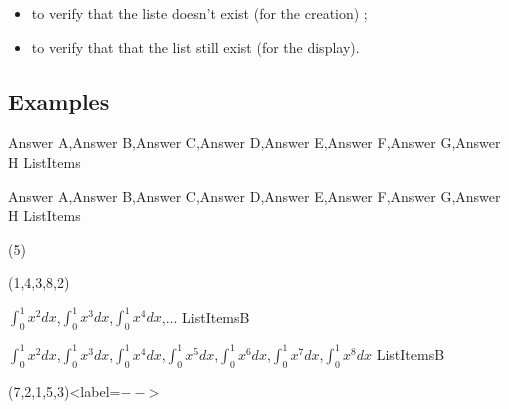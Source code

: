\documentclass[english,11pt,a4paper]{article}
\begin{document}
\begin{itemize}
	\item to verify that the liste doesn't exist (for the creation) ;
	\item to verify that that the list still exist (for the display).
\end{itemize}

\subsection{Examples}

\begin{codehigh}[language=latex/latex3,style/main=teal!25,style/code=teal!25]
\CreateItemsList%
    {Answer A,Answer B,Answer C,Answer D,Answer E,Answer F,Answer G,Answer H}%
    {\mylistofitems}{ListItems}
\end{codehigh}

\CreateItemsList%
{Answer A,Answer B,Answer C,Answer D,Answer E,Answer F,Answer G,Answer H}%
{\mylistofitems}{ListItems}

\begin{demohigh}[language=latex/latex3,style/main=teal!25,style/code=teal!25]
(5)
\end{demohigh}

\begin{demohigh}[language=latex/latex3,style/main=teal!25,style/code=teal!25]
(1,4,3,8,2)
\end{demohigh}

\begin{codehigh}[language=latex/latex3,style/main=teal!25,style/code=teal!25]
\CreateItemsList%
    {{$\int_0^1 x^2 dx$},{$\int_0^1 x^3 dx$},{$\int_0^1 x^4 dx$},...}%
    {\mylistofitemsb}{ListItemsB}
\end{codehigh}

\CreateItemsList%
{{$\int_0^1 x^2 dx$},{$\int_0^1 x^3 dx$},{$\int_0^1 x^4 dx$},{$\int_0^1 x^5 dx$},{$\int_0^1 x^6 dx$},{$\int_0^1 x^7 dx$},{$\int_0^1 x^8 dx$}}%
{\mylistofitemsb}{ListItemsB}

\begin{codehigh}[language=latex/latex3,style/main=teal!25,style/code=teal!25]
(7,2,1,5,3)<label=$--$>
\end{codehigh}
\end{document}
